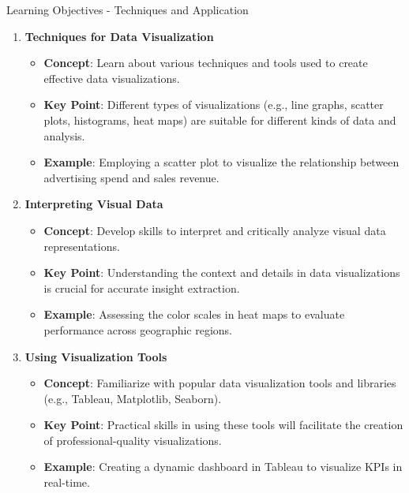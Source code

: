 \documentclass[aspectratio=169]{beamer}
\begin{document}
\begin{frame}[fragile]{Learning Objectives - Techniques and Application}
    \begin{enumerate}[resume]
        \item \textbf{Techniques for Data Visualization}
            \begin{itemize}
                \item \textbf{Concept}: Learn about various techniques and tools used to create effective data visualizations.
                \item \textbf{Key Point}: Different types of visualizations (e.g., line graphs, scatter plots, histograms, heat maps) are suitable for different kinds of data and analysis.
                \item \textbf{Example}: Employing a scatter plot to visualize the relationship between advertising spend and sales revenue.
            \end{itemize}
        
        \item \textbf{Interpreting Visual Data}
            \begin{itemize}
                \item \textbf{Concept}: Develop skills to interpret and critically analyze visual data representations.
                \item \textbf{Key Point}: Understanding the context and details in data visualizations is crucial for accurate insight extraction.
                \item \textbf{Example}: Assessing the color scales in heat maps to evaluate performance across geographic regions.
            \end{itemize}
        
        \item \textbf{Using Visualization Tools}
            \begin{itemize}
                \item \textbf{Concept}: Familiarize with popular data visualization tools and libraries (e.g., Tableau, Matplotlib, Seaborn).
                \item \textbf{Key Point}: Practical skills in using these tools will facilitate the creation of professional-quality visualizations.
                \item \textbf{Example}: Creating a dynamic dashboard in Tableau to visualize KPIs in real-time.
            \end{itemize}
    \end{enumerate}
\end{frame}
\end{document}
